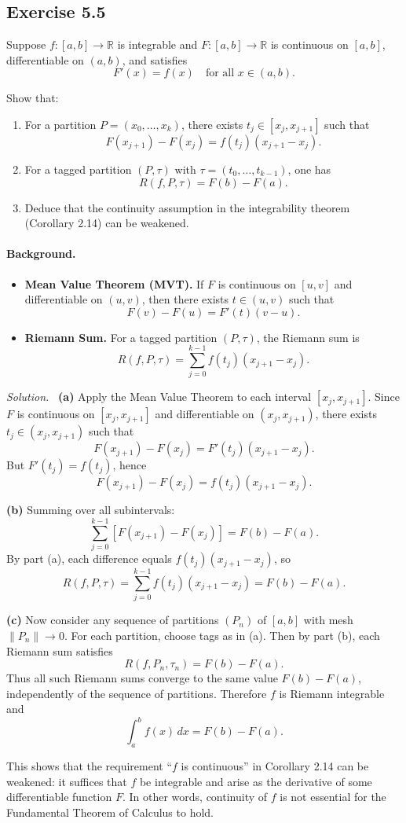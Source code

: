 \documentclass[11pt,a4paper]{article}
\newenvironment{solution}{\par\noindent\textit{Solution.}\ }{\par\vspace{0.5em}}
\begin{document}
\subsection*{Exercise 5.5}
Suppose $f:[a,b]\to\mathbb{R}$ is integrable and $F:[a,b]\to\mathbb{R}$ is continuous on $[a,b]$, differentiable on $(a,b)$, and satisfies
\[
F'(x)=f(x) \quad \text{for all } x\in(a,b).
\]

Show that:

\begin{enumerate}
	\item For a partition $P=(x_0,\ldots,x_k)$, there exists $t_j \in [x_j,x_{j+1}]$ such that
	\[
	F(x_{j+1})-F(x_j)=f(t_j)(x_{j+1}-x_j).
	\]
	\item For a tagged partition $(P,\tau)$ with $\tau=(t_0,\ldots,t_{k-1})$, one has
	\[
	R(f,P,\tau)=F(b)-F(a).
	\]
	\item Deduce that the continuity assumption in the integrability theorem (Corollary 2.14) can be weakened.
\end{enumerate}

\paragraph{Background.}
\begin{itemize}
	\item \textbf{Mean Value Theorem (MVT).} If $F$ is continuous on $[u,v]$ and differentiable on $(u,v)$, then there exists $t\in(u,v)$ such that
	\[
	F(v)-F(u)=F'(t)(v-u).
	\]
	\item \textbf{Riemann Sum.} For a tagged partition $(P,\tau)$, the Riemann sum is
	\[
	R(f,P,\tau)=\sum_{j=0}^{k-1} f(t_j)(x_{j+1}-x_j).
	\]
\end{itemize}

\begin{solution}
	\textbf{(a)}  
	Apply the Mean Value Theorem to each interval $[x_j,x_{j+1}]$. Since $F$ is continuous on $[x_j,x_{j+1}]$ and differentiable on $(x_j,x_{j+1})$, there exists $t_j\in(x_j,x_{j+1})$ such that
	\[
	F(x_{j+1})-F(x_j)=F'(t_j)(x_{j+1}-x_j).
	\]
	But $F'(t_j)=f(t_j)$, hence
	\[
	F(x_{j+1})-F(x_j)=f(t_j)(x_{j+1}-x_j).
	\]
	
	\textbf{(b)}  
	Summing over all subintervals:
	\[
	\sum_{j=0}^{k-1}[F(x_{j+1})-F(x_j)]=F(b)-F(a).
	\]
	By part (a), each difference equals $f(t_j)(x_{j+1}-x_j)$, so
	\[
	R(f,P,\tau)=\sum_{j=0}^{k-1} f(t_j)(x_{j+1}-x_j)=F(b)-F(a).
	\]
	
	\textbf{(c)}  
	Now consider any sequence of partitions $(P_n)$ of $[a,b]$ with mesh $\|P_n\|\to 0$. For each partition, choose tags as in (a). Then by part (b), each Riemann sum satisfies
	\[
	R(f,P_n,\tau_n)=F(b)-F(a).
	\]
	Thus all such Riemann sums converge to the same value $F(b)-F(a)$, independently of the sequence of partitions. Therefore $f$ is Riemann integrable and
	\[
	\int_a^b f(x)\,dx=F(b)-F(a).
	\]
	
	This shows that the requirement ``$f$ is continuous'' in Corollary 2.14 can be weakened: it suffices that $f$ be integrable and arise as the derivative of some differentiable function $F$. In other words, continuity of $f$ is not essential for the Fundamental Theorem of Calculus to hold.
\end{solution}
\end{document}

